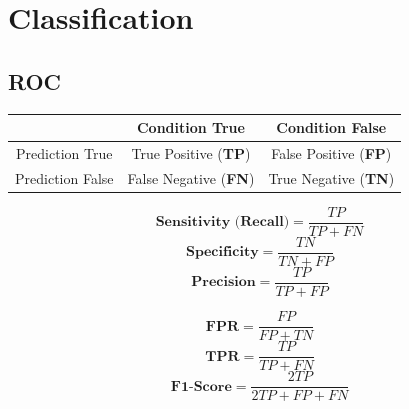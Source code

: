 \documentclass[a4paper,9pt,fleqn]{extarticle}
\begin{document}
\section{Classification}
\subsection*{ROC}
\noindent
\begin{minipage}[t]{0.45\textwidth}
    \vspace{0pt}
    \begin{tabular}{c|cc}
        & Condition True & Condition False \\
        \hline
        Prediction True & True Positive (\textbf{TP}) & False Positive (\textbf{FP}) \\
        Prediction False & False Negative (\textbf{FN}) & True Negative (\textbf{TN}) \\
    \end{tabular}
\end{minipage}
\hfill
\begin{minipage}[t]{0.25\textwidth}
    \vspace{0pt}
    \[
    \textbf{Sensitivity (Recall)} = \frac{TP}{TP + FN}
    \]
    \[
    \textbf{Specificity} = \frac{TN}{TN + FP}
    \]
    \[
    \textbf{Precision} = \frac{TP}{TP + FP}
    \]
\end{minipage}
\hfill
\begin{minipage}[t]{0.25\textwidth}
    \vspace{0pt}
    \[
    \textbf{FPR} = \frac{FP}{FP + TN}
    \]
    \[
    \textbf{TPR} = \frac{TP}{TP + FN}
    \]
    \[
    \textbf{F1-Score} = \frac{2TP}{2TP + FP + FN}
    \]
\end{minipage}

\vspace{1em} %
\end{document}
